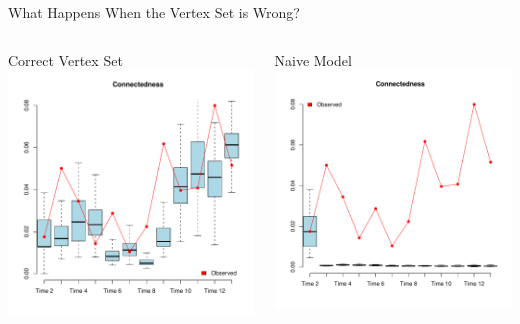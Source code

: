 \documentclass[10pt]{beamer}
\begin{document}
\begin{frame}{What Happens When the Vertex Set is Wrong?}
\begin{columns}
\begin{block}{\small{Correct Vertex Set}}
\includegraphics[width=.85\linewidth]{graphics/fixedVertexConnectedness}
\end{block}

\begin{block}{\small{Naive Model}}
\includegraphics[width=.85\linewidth]{graphics/simpleVertexConnectedness}
\end{block}


\end{columns}
\end{frame}
\end{document}
